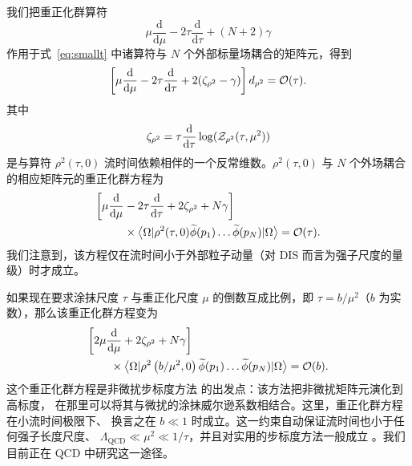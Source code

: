 我们把重正化群算符
\begin{equation}
\mu\frac{\mathrm{d}}{\mathrm{d} \mu}
-2\tau\frac{\mathrm{d}}{\mathrm{d} \tau} + \left(N+2\right)\gamma
\end{equation}
作用于式~\eqref{eq:smallt} 中诸算符与 $N$ 个外部标量场耦合的矩阵元，得到
\begin{equation}\label{eq:srge}
\left[\mu\frac{\mathrm{d}}{\mathrm{d}
\mu} -2\tau\frac{\mathrm{d}}{\mathrm{d}
\tau} +2(\zeta_{\rho^2}-\gamma)\right]d_{\rho^2} = {\cal O}(\tau).
\end{equation}
其中
\begin{equation}
\zeta_{\rho^2} = \tau\frac{\mathrm{d}}{\mathrm{d}\tau}\log({\cal
Z}_{\rho^2}(\tau,\mu^2))\label{eq:zetadef}
\end{equation}
是与算符 $\rho^2(\tau,0)$ 流时间依赖相伴的一个反常维数。$\rho^2(\tau,0)$
与 $N$ 个外场耦合的相应矩阵元的重正化群方程为
\begin{align}\label{eq:rhotau}
\bigg[\mu\frac{\mathrm{d}}{\mathrm{d}
\mu}{} & -2\tau\frac{\mathrm{d}}{\mathrm{d}
\tau} +2\zeta_{\rho^2}+N\gamma\bigg] \nonumber\\
{} & \times\big\langle \Omega
|\rho^2(\tau,0)\widetilde{\phi}(p_1)\ldots\widetilde{\phi}(p_N)
| \Omega \big\rangle = {\cal O}(\tau).
\end{align}
我们注意到，该方程仅在流时间小于外部粒子动量（对 DIS 而言为强子尺度的量级）时才成立。

如果现在要求涂抹尺度 $\tau$ 与重正化尺度 $\mu$ 的倒数互成比例，即
$\tau = b/\mu^2$（$b$ 为实数），那么该重正化群方程变为
\begin{align}\label{eq:rhotau_mutau}
{} &
\bigg[2\mu\frac{\mathrm{d}}{\mathrm{d}
\mu} +2\zeta_{\rho^2}+N\gamma\bigg] \nonumber\\
{} &\qquad \times\big\langle \Omega
|\rho^2\left( b/\mu^2,0\right)\widetilde{\phi}(p_1)\ldots\widetilde{\phi
} (p_N)
| \Omega \big\rangle = {\cal O}(b).
\end{align}
这个重正化群方程是非微扰步标度方法
\cite{Monahan:2013lwa,Luscher:1991oxn} 的出发点：该方法把非微扰矩阵元演化到高标度，
在那里可以将其与微扰的涂抹威尔逊系数相结合。这里，重正化群方程在小流时间极限下、
换言之在 $b\ll 1$ 时成立。这一约束自动保证流时间也小于任何强子长度尺度、
$\Lambda_{\mathrm{QCD}} \ll \mu^2 \ll 1/\tau$，并且对实用的步标度方法一般成立
\cite{Monahan:2013lwa,Luscher:1991oxn}。我们目前正在 QCD 中研究这一途径。
